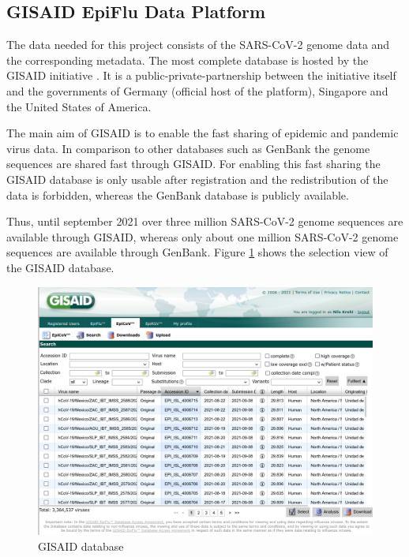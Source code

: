 \subsection{GISAID EpiFlu Data Platform} \label{fundamentalsB}

The data needed for this project consists of the \ac{SARS-CoV-2} genome data and the corresponding metadata. The most complete database is hosted by the \ac{GISAID} initiative \cite{Gisaid2021}. It is a public-private-partnership between the initiative itself and the governments of Germany (official host of the platform), Singapore and the United States of America. \cite{gisaideditorGISAID2021}

The main aim of \ac{GISAID} is to enable the fast sharing of epidemic and pandemic virus data. In comparison to other databases such as GenBank the genome sequences are shared fast through \ac{GISAID}. For enabling this fast sharing the \ac{GISAID} database is only usable after registration and the  redistribution of the data is forbidden, whereas the GenBank database is publicly available. \cite{shuGISAIDGlobalInitiative2017}

Thus, until september 2021 over three million \ac{SARS-CoV-2} genome sequences are available through \ac{GISAID}, whereas only about one million \ac{SARS-CoV-2} genome sequences are available through GenBank. Fi\-gu\-re \ref{gisaid} shows the selection view of the \ac{GISAID} database. \cite{gisaideditorGISAID2021, nationallibraryofmedicinencbieditorNCBISARSCoV2Resources}

\begin{figure}[ht]
	\centering
	\includegraphics[width=0.9\linewidth]{figures/gisaid.png}
	\caption{\ac{GISAID} database \cite{own screenshot}}
	\label{gisaid}
\end{figure}


